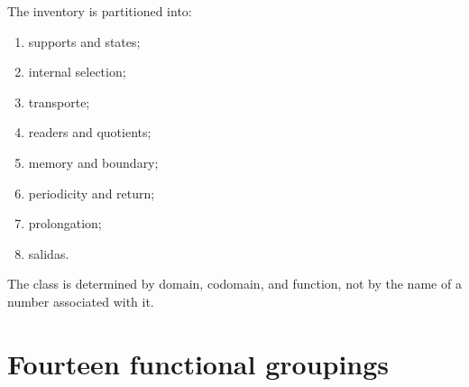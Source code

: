 The inventory is partitioned into:
\begin{enumerate}
 \item[\textbf{C1.}] supports and states;
 \item[\textbf{C2.}] internal selection;
 \item[\textbf{C3.}] transporte;
 \item[\textbf{C4.}] readers and quotients;
 \item[\textbf{C5.}] memory and boundary;
 \item[\textbf{C6.}] periodicity and return;
 \item[\textbf{C7.}] prolongation;
 \item[\textbf{C8.}] salidas.
\end{enumerate}
The class is determined by domain, codomain, and function, not by the name of a number associated with it.

\section{Fourteen functional groupings}

